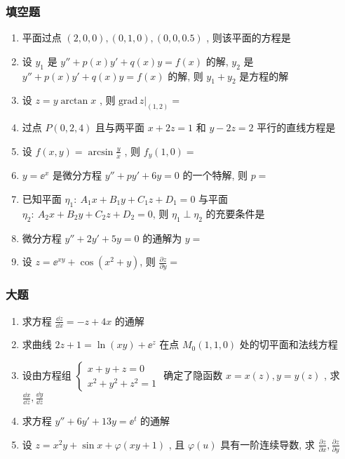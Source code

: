 \subsubsection{填空题}
\begin{enumerate}
	\item 平面过点 $(2,0,0),(0,1,0),(0,0,0.5)$ , 则该平面的方程是\underline{\hspace{8pc}}
	\item 设 $y_1$ 是 $y''+p(x)y'+q(x)y=f(x)$ 的解, $y_2$ 是 $y''+p(x)y'+q(x)y=f(x)$ 的解, 则 $y_1+y_2$ 是\underline{\hspace{8pc}}方程的解
	\item 设 $z=y\arctan x$ , 则 $\left.\mathrm{grad}\,z\right|_{(1,2)}=$\underline{\hspace{8pc}}
	\item 过点 $P(0,2,4)$ 且与两平面 $x+2z=1$ 和 $y-2z=2$ 平行的直线方程是\underline{\hspace{8pc}}
	\item 设 $f(x,y)=\arcsin\frac{y}{x}$ , 则 $f_y(1,0)=$\underline{\hspace{8pc}}
	\item $y=\ee^x$ 是微分方程 $y''+py'+6y=0$ 的一个特解, 则 $p=$\underline{\hspace{8pc}}
	\item 已知平面 $\eta_1:\ A_1x+B_1y+C_1z+D_1=0$ 与平面 $\eta_2:\ A_2x+B_2y+C_2z+D_2=0$, 则 $\eta_1\perp\eta_2$ 的充要条件是\underline{\hspace{8pc}}
	\item 微分方程 $y''+2y'+5y=0$ 的通解为 $y=$\underline{\hspace{8pc}}
	\item 设 $z=\ee^{xy}+\cos\left(x^2+y\right)$, 则 $\frac{\partial z}{\partial y}=$\underline{\hspace{8pc}}
\end{enumerate}
\subsubsection{大题}
\begin{enumerate}
	\item 求方程 $\frac{\dd z}{\dd x}=-z+4x$ 的通解
	\item 求曲线 $2z+1=\ln(xy)+\ee^z$ 在点 $M_{0}(1,1,0)$ 处的切平面和法线方程
	\item 设由方程组 $\begin{cases}
	x+y+z=0\\
	x^2+y^2+z^2=1
	\end{cases}$
	确定了隐函数 $x=x(z),y=y(z)$ , 求 $\frac{\dd x}{\dd z},\frac{\dd y}{\dd z}$
	\item 求方程 $y''+6y'+13y=\ee^t$ 的通解
	\item 设 $z=x^2y+\sin x+\varphi(xy+1)$ , 且 $\varphi(u)$ 具有一阶连续导数, 求 $\frac{\partial z}{\partial x},\frac{\partial z}{\partial y}$
\end{enumerate}

